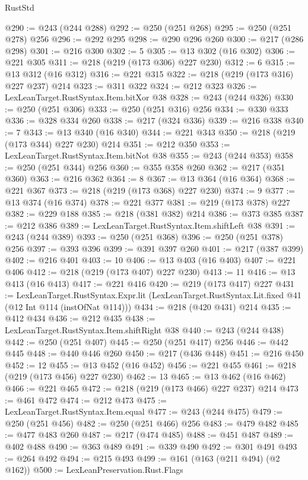 \begin{lexlean}{RustStd}
\begin{coremodule}
@290 := @243 (@244 @288)
@292 := @250 (@251 @268)
@295 := @250 (@251 @278) @256
@296 := @292 @295
@298 := @290 @296 @260
@300 := @217 (@286 @298)
@301 := @216 @300
@302 := 5
@305 := @13 @302 (@16 @302)
@306 := @221 @305
@311 := @218 (@219 (@173 @306) @227 @230)
@312 := 6
@315 := @13 @312 (@16 @312)
@316 := @221 @315
@322 := @218 (@219 (@173 @316) @227 @237) @214
@323 := @311 @322
@324 := @212 @323
@326 := LexLeanTarget.RustSyntax.Item.bitXor @38
@328 := @243 (@244 @326)
@330 := @250 (@251 @306)
@333 := @250 (@251 @316) @256
@334 := @330 @333
@336 := @328 @334 @260
@338 := @217 (@324 @336)
@339 := @216 @338
@340 := 7
@343 := @13 @340 (@16 @340)
@344 := @221 @343
@350 := @218 (@219 (@173 @344) @227 @230) @214
@351 := @212 @350
@353 := LexLeanTarget.RustSyntax.Item.bitNot @38
@355 := @243 (@244 @353)
@358 := @250 (@251 @344) @256
@360 := @355 @358 @260
@362 := @217 (@351 @360)
@363 := @216 @362
@364 := 8
@367 := @13 @364 (@16 @364)
@368 := @221 @367
@373 := @218 (@219 (@173 @368) @227 @230)
@374 := 9
@377 := @13 @374 (@16 @374)
@378 := @221 @377
@381 := @219 (@173 @378) @227
@382 := @229 @188
@385 := @218 (@381 @382) @214
@386 := @373 @385
@387 := @212 @386
@389 := LexLeanTarget.RustSyntax.Item.shiftLeft @38
@391 := @243 (@244 @389)
@393 := @250 (@251 @368)
@396 := @250 (@251 @378) @256
@397 := @393 @396
@399 := @391 @397 @260
@401 := @217 (@387 @399)
@402 := @216 @401
@403 := 10
@406 := @13 @403 (@16 @403)
@407 := @221 @406
@412 := @218 (@219 (@173 @407) @227 @230)
@413 := 11
@416 := @13 @413 (@16 @413)
@417 := @221 @416
@420 := @219 (@173 @417) @227
@431 := LexLeanTarget.RustSyntax.Expr.lit
    (LexLeanTarget.RustSyntax.Lit.fixed @41 (@12 Int @114 (instOfNat @114)))
@434 := @218 (@420 @431) @214
@435 := @412 @434
@436 := @212 @435
@438 := LexLeanTarget.RustSyntax.Item.shiftRight @38
@440 := @243 (@244 @438)
@442 := @250 (@251 @407)
@445 := @250 (@251 @417) @256
@446 := @442 @445
@448 := @440 @446 @260
@450 := @217 (@436 @448)
@451 := @216 @450
@452 := 12
@455 := @13 @452 (@16 @452)
@456 := @221 @455
@461 := @218 (@219 (@173 @456) @227 @230)
@462 := 13
@465 := @13 @462 (@16 @462)
@466 := @221 @465
@472 := @218 (@219 (@173 @466) @227 @237) @214
@473 := @461 @472
@474 := @212 @473
@475 := LexLeanTarget.RustSyntax.Item.equal
@477 := @243 (@244 @475)
@479 := @250 (@251 @456)
@482 := @250 (@251 @466) @256
@483 := @479 @482
@485 := @477 @483 @260
@487 := @217 (@474 @485)
@488 := @451 @487
@489 := @402 @488
@490 := @363 @489
@491 := @339 @490
@492 := @301 @491
@493 := @264 @492
@494 := @215 @493
@499 := @161 (@163 (@211 @494) (@2 @162))
@500 := LexLeanPreservation.Rust.Flags

\end{coremodule}
\end{lexlean}
